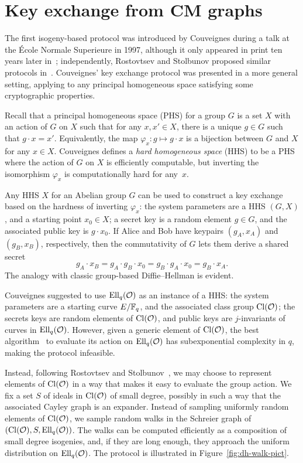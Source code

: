 \documentclass{report}
\theoremstyle{plain}
\theoremstyle{definition}
\begin{document}

\section{Key exchange from CM graphs}

The first isogeny-based protocol was introduced by Couveignes during a
talk at the École Normale Superieure in 1997, although it only
appeared in print ten years later in~\cite{cryptoeprint:2006:291};
independently, Rostovtsev and Stolbunov proposed similar protocols
in~\cite{rostovtsev+stolbunov06,Stol}. %
Couveignes' key exchange protocol was presented in a more general
setting, applying to any principal homogeneous space satisfying some
cryptographic properties.

Recall that a principal homogeneous space (PHS) for a group $G$ is a
set $X$ with an action of $G$ on $X$ such that for any $x,x'\in X$,
there is a unique $g\in G$ such that $g\cdot x = x'$. %
Equivalently, the map $φ_x: g\mapsto g\cdot x$ is a bijection between
$G$ and $X$ for any $x\in X$. %
Couveignes defines a \emph{hard homogeneous space} (HHS) to be a PHS
where the action of $G$ on $X$ is efficiently computable, but
inverting the isomorphism $φ_x$ is computationally hard for any~$x$.

Any HHS $X$ for an Abelian group $G$ can be used to construct a key
exchange based on the hardness of inverting $\varphi_x$: the system
parameters are a HHS $(G,X)$, and a starting point $x_0∈X$; a secret
key is a random element $g∈G$, and the associated public key is
$g·x_0$. %
If Alice and Bob have keypairs $(g_A,x_A)$ and $(g_B,x_B)$,
respectively, then the commutativity of $G$ lets them derive a shared
secret
\begin{equation*}
  g_A·x_B = g_A·g_B· x_0 = g_B·g_A·x_0 = g_B·x_A.
\end{equation*}
The analogy with classic group-based Diffie--Hellman is evident.

Couveignes suggested to use $\operatorname{Ell}_q(\mathcal{O})$ as an instance of a HHS: the
system parameters are a starting curve $E/\mathbb{F}_q$, and the associated
class group $\operatorname{Cl}(\mathcal{O})$; the secrets keys are random elements of
$\operatorname{Cl}(\mathcal{O})$, and public keys are $j$-invariants of curves in
$\operatorname{Ell}_q(\mathcal{O})$. %
However, given a generic element of $\operatorname{Cl}(\mathcal{O})$, the best
algorithm~\cite{jao+soukharev10} to evaluate its action on
$\operatorname{Ell}_q(\mathcal{O})$ has subexponential complexity in $q$, making the protocol
infeasible. %

Instead, following Rostovtsev and
Stolbunov~\cite{rostovtsev+stolbunov06}, we may choose to represent
elements of $\operatorname{Cl}(\mathcal{O})$ in a way that makes it easy to evaluate the
group action. %
We fix a set $S$ of ideals in $\operatorname{Cl}(\mathcal{O})$ of small degree, possibly in
such a way that the associated Cayley graph is an expander. %
Instead of sampling uniformly random elements of $\operatorname{Cl}(\mathcal{O})$, we sample
random walks in the Schreier graph of $(\operatorname{Cl}(\mathcal{O}),S,\operatorname{Ell}_q(\mathcal{O}))$. %
The walks can be computed efficiently as a composition of small degree
isogenies, and, if they are long enough, they approach the uniform
distribution on $\operatorname{Ell}_q(\mathcal{O})$. %
The protocol is illustrated in Figure~\ref{fig:dh-walk-pict}. %
\end{document}

